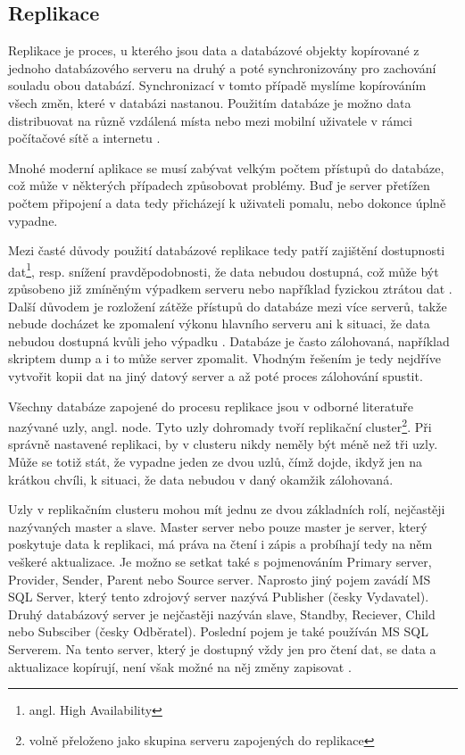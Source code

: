         \subsection{Replikace}
        \label{kReplikace}
Replikace je proces, u kterého jsou data a databázové objekty kopírované z jednoho databázového serveru na druhý a poté synchronizovány pro zachování souladu obou databází. Synchronizací v tomto případě myslíme kopírováním všech změn, které v databázi nastanou. Použitím databáze je možno data distribuovat na různě vzdálená místa nebo mezi mobilní uživatele v rámci počítačové sítě a internetu \citep{Microsoft2013}.

Mnohé moderní aplikace se musí zabývat velkým počtem přístupů do databáze, což může v některých případech způsobovat problémy. Buď je server přetížen počtem připojení a data tedy přicházejí k uživateli pomalu, nebo dokonce úplně vypadne. 

Mezi časté důvody použití databázové replikace tedy patří zajištění dostupnosti dat\footnote{angl. High Availability}, resp. snížení pravděpodobnosti, že data nebudou dostupná, což může být způsobeno již zmíněným výpadkem serveru nebo například fyzickou ztrátou dat \citep{ObeHsu2012}. Další důvodem je rozložení zátěže přístupů do databáze mezi více serverů, takže nebude docházet ke zpomalení výkonu hlavního serveru ani k situaci, že data nebudou dostupná kvůli jeho výpadku \citep{BellKindahlThalmann2010}. Databáze je často zálohovaná, například skriptem dump a i to může server zpomalit. Vhodným řešením je tedy nejdříve vytvořit kopii dat na jiný datový server a až poté proces zálohování spustit. 

Všechny databáze zapojené do procesu replikace jsou v odborné literatuře nazývané uzly, angl. node. Tyto uzly dohromady tvoří replikační cluster\footnote{volně přeloženo jako skupina serveru zapojených do replikace}. Při správně nastavené replikaci, by v clusteru nikdy neměly být méně než tři uzly. Může se totiž stát, že vypadne jeden ze dvou uzlů, čímž dojde, ikdyž jen na krátkou chvíli, k situaci, že data nebudou v daný okamžik zálohovaná. 

Uzly v replikačním clusteru mohou mít jednu ze dvou základních rolí, nejčastěji nazývaných master a slave. Master server nebo pouze master je server, který poskytuje data k replikaci, má práva na čtení i zápis a probíhají tedy na něm veškeré aktualizace. Je možno se setkat také s pojmenováním Primary server, Provider, Sender, Parent nebo Source server. Naprosto jiný pojem zavádí MS SQL Server, který tento zdrojový server nazývá Publisher (česky Vydavatel). Druhý databázový server je nejčastěji nazýván slave, Standby, Reciever, Child nebo Subsciber (česky Odběratel). Poslední pojem je také používán MS SQL Serverem. Na tento server, který je dostupný vždy jen pro čtení dat, se data a aktualizace kopírují, není však možné na něj změny zapisovat \citep{RiggsKrossing2010}.

